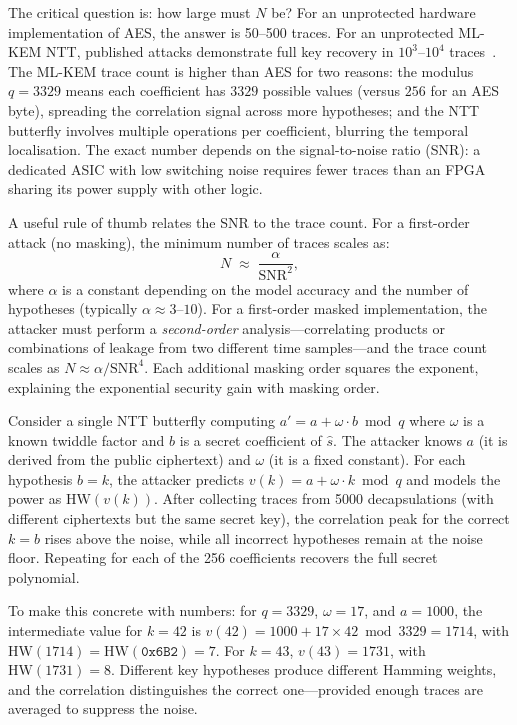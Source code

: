 The critical question is: how large must $N$ be?  For an unprotected hardware implementation of AES, the answer is 50--500 traces.  For an unprotected ML-KEM NTT, published attacks demonstrate full key recovery in $10^3$--$10^4$ traces~\cite{RaviRoyBhasin2020, NgoRaviSinhaRoy2021}.  The ML-KEM trace count is higher than AES for two reasons: the modulus $q = 3329$ means each coefficient has $3329$ possible values (versus $256$ for an AES byte), spreading the correlation signal across more hypotheses; and the NTT butterfly involves multiple operations per coefficient, blurring the temporal localisation.  The exact number depends on the signal-to-noise ratio (SNR): a dedicated ASIC with low switching noise requires fewer traces than an FPGA sharing its power supply with other logic.

A useful rule of thumb relates the SNR to the trace count.  For a first-order attack (no masking), the minimum number of traces scales as:
\begin{equation}
\label{eq:trace-count-snr}
N \;\approx\; \frac{\alpha}{\text{SNR}^2},
\end{equation}
where $\alpha$ is a constant depending on the model accuracy and the number of hypotheses (typically $\alpha \approx 3$--$10$).  For a first-order masked implementation, the attacker must perform a \emph{second-order} analysis---correlating products or combinations of leakage from two different time samples---and the trace count scales as $N \approx \alpha / \text{SNR}^4$.  Each additional masking order squares the exponent, explaining the exponential security gain with masking order.

\begin{example}
\label{ex:cpa-ntt}
Consider a single NTT butterfly computing $a' = a + \omega \cdot b \bmod q$ where $\omega$ is a known twiddle factor and $b$ is a secret coefficient of $\hat{s}$.  The attacker knows $a$ (it is derived from the public ciphertext) and $\omega$ (it is a fixed constant).  For each hypothesis $b = k$, the attacker predicts $v(k) = a + \omega \cdot k \bmod q$ and models the power as $\text{HW}(v(k))$.  After collecting traces from 5000 decapsulations (with different ciphertexts but the same secret key), the correlation peak for the correct $k = b$ rises above the noise, while all incorrect hypotheses remain at the noise floor.  Repeating for each of the 256 coefficients recovers the full secret polynomial.

To make this concrete with numbers: for $q = 3329$, $\omega = 17$, and $a = 1000$, the intermediate value for $k = 42$ is $v(42) = 1000 + 17 \times 42 \bmod 3329 = 1714$, with $\text{HW}(1714) = \text{HW}(\texttt{0x6B2}) = 7$.  For $k = 43$, $v(43) = 1731$, with $\text{HW}(1731) = 8$.  Different key hypotheses produce different Hamming weights, and the correlation distinguishes the correct one---provided enough traces are averaged to suppress the noise.
\end{example}


